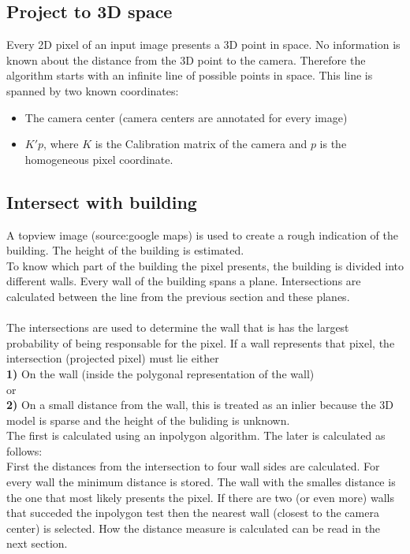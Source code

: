 \documentclass[10pt]{article}
\begin{document}
\subsection{Project to 3D space}
Every 2D pixel of an input image presents a 3D point in space. No
information is known about the distance from the 3D point to the camera.
Therefore the algorithm starts with an infinite line of possible points in space.
This line is spanned by two known coordinates:\\
\begin{itemize}
	\item The camera center (camera centers are annotated for every image)
	\item $K'p$, where $K$ is the Calibration matrix of the camera and $p$ is the homogeneous pixel coordinate.
\end{itemize}

\subsection{Intersect with building}
A topview image (source:google maps) is used to create a rough indication of the building. The height of the building is estimated.\\
To know which part of the building the pixel presents, the building is divided into different walls.  Every wall of the building spans a plane. Intersections are calculated between the line from the previous section and these planes.\\
\\
The intersections are used to determine the wall that is has the largest probability of being responsable for the pixel. 
If a wall represents that pixel, the intersection (projected pixel) must lie either\\
\textbf{1)} On the wall (inside the polygonal representation of the wall)
\\
or
\\
\textbf{2)} On a small distance from the wall, this is treated as an inlier because the 3D model is sparse and the height of the buliding is unknown.
\\
The first is calculated using an inpolygon algorithm. The later is calculated as follows:
\\
First the distances from the intersection to four wall sides are calculated. For every wall the minimum distance is stored. The wall with the smalles distance is the one that most likely presents the pixel. If there are two (or even more) walls that succeded the inpolygon test then the nearest wall (closest to the camera center) is selected. How the distance measure is calculated can be read in the next section.
\end{document}
